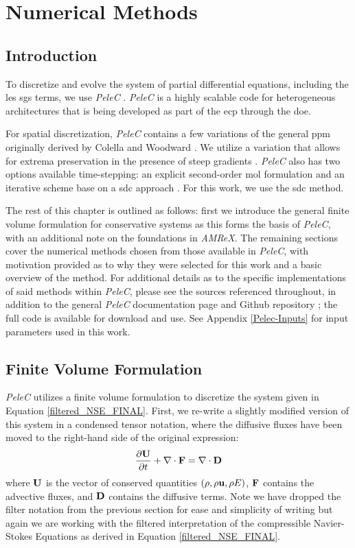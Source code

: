 \chapter{Numerical Methods}
\section{Introduction}
To discretize and evolve the system of partial differential equations, including the \gls{les} \gls{sgs} terms, we use \textit{PeleC} \cite{PeleC1, PeleC2}. \textit{PeleC} is a highly scalable code for heterogeneous architectures that is being developed as part of the \gls{ecp} through the \gls{doe}. 

For spatial discretization, \textit{PeleC} contains a few variations of the general \gls{ppm} originally derived by Colella and Woodward \cite{1984JCoPPPM}. We utilize a variation that allows for extrema preservation in the presence of steep gradients \cite{MILLER200226, COLELLA20087069}. \textit{PeleC} also has two options available time-stepping: an explicit second-order \gls{mol} formulation and an iterative scheme base on a \gls{sdc} approach \cite{SDC_PeleC}. For this work, we use the \gls{sdc} method. 

The rest of this chapter is outlined as follows: first we introduce the general finite volume formulation for conservative systems as this forms the basis of \textit{PeleC}, with an additional note on the foundations in \textit{AMReX}. The remaining sections cover the numerical methods chosen from those available in \textit{PeleC}, with motivation provided as to why they were selected for this work and a basic overview of the method. For additional details as to the specific implementations of said methods within \textit{PeleC}, please see the sources referenced throughout, in addition to the general \textit{PeleC} documentation page \cite{PeleC_doc} and Github repository \cite{PeleC_Github}; the full code is available for download and use. See Appendix \ref{Pelec-Inputs} for input parameters used in this work.  

\section{Finite Volume Formulation} \label{FVM_section}
\textit{PeleC} utilizes a finite volume formulation \cite{} to discretize the system given in Equation \eqref{filtered_NSE_FINAL}. First, we re-write a slightly modified version of this system in a condensed tensor notation, where the diffusive fluxes have been moved to the right-hand side of the original expression: 
\begin{equation} \label{NSE_tensor}
\dfrac{\partial \vb{U}}{\partial t} + \nabla \cdot \vb{F} = \nabla \cdot \vb{D}
\end{equation}
where $\vb{U}$ is the vector of conserved quantities $(\rho, \rho \vb{u}, \rho E)$, $\vb{F}$ contains the advective fluxes, and $\vb{D}$ contains the diffusive terms. Note we have dropped the filter notation from the previous section for ease and simplicity of writing but again we are working with the filtered interpretation of the compressible Navier-Stokes Equations as derived in Equation \eqref{filtered_NSE_FINAL}. 

